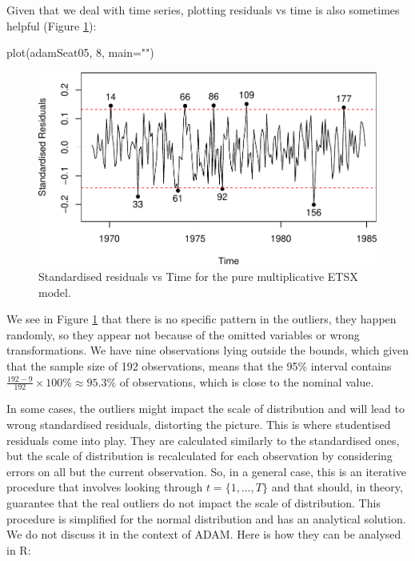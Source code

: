 \documentclass[
]{book}
\newenvironment{Shaded}{\begin{snugshade}}{\end{snugshade}}
\newcommand{\AttributeTok}[1]{\textcolor[rgb]{0.77,0.63,0.00}{#1}}
\newcommand{\DecValTok}[1]{\textcolor[rgb]{0.00,0.00,0.81}{#1}}
\newcommand{\FunctionTok}[1]{\textcolor[rgb]{0.00,0.00,0.00}{#1}}
\newcommand{\NormalTok}[1]{#1}
\newcommand{\StringTok}[1]{\textcolor[rgb]{0.31,0.60,0.02}{#1}}
\theoremstyle{definition}
\theoremstyle{definition}
\theoremstyle{definition}
\theoremstyle{definition}
\theoremstyle{remark}
\begin{document}
Given that we deal with time series, plotting residuals vs time is also sometimes helpful (Figure \ref{fig:adamSeat05ResidTime}):

\begin{Shaded}
\begin{Highlighting}[]
\FunctionTok{plot}\NormalTok{(adamSeat05, }\DecValTok{8}\NormalTok{, }\AttributeTok{main=}\StringTok{""}\NormalTok{)}
\end{Highlighting}
\end{Shaded}

\begin{figure}
\centering
\includegraphics{Svetunkov--2022----ADAM_files/figure-latex/adamSeat05ResidTime-1.pdf}
\caption{\label{fig:adamSeat05ResidTime}Standardised residuals vs Time for the pure multiplicative ETSX model.}
\end{figure}

We see in Figure \ref{fig:adamSeat05ResidTime} that there is no specific pattern in the outliers, they happen randomly, so they appear not because of the omitted variables or wrong transformations. We have nine observations lying outside the bounds, which given that the sample size of 192 observations, means that the 95\% interval contains \(\frac{192-9}{192} \times 100 \% \approx 95.3 \%\) of observations, which is close to the nominal value.

In some cases, the outliers might impact the scale of distribution and will lead to wrong standardised residuals, distorting the picture. This is where studentised residuals come into play. They are calculated similarly to the standardised ones, but the scale of distribution is recalculated for each observation by considering errors on all but the current observation. So, in a general case, this is an iterative procedure that involves looking through \(t=\{1,\dots,T\}\) and that should, in theory, guarantee that the real outliers do not impact the scale of distribution. This procedure is simplified for the normal distribution and has an analytical solution. We do not discuss it in the context of ADAM. Here is how they can be analysed in R:
\end{document}
